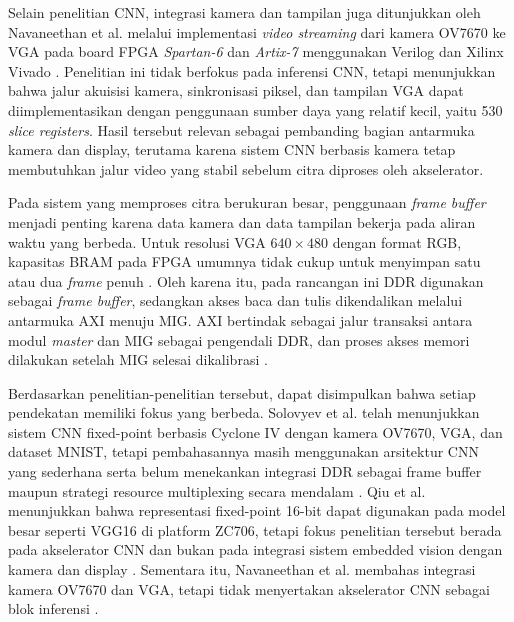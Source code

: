     Selain penelitian CNN, integrasi kamera dan tampilan juga ditunjukkan
    oleh Navaneethan et al. melalui implementasi \emph{video streaming}
    dari kamera OV7670 ke VGA pada board FPGA \emph{Spartan-6} dan
    \emph{Artix-7} menggunakan Verilog dan Xilinx Vivado
    \cite{Navaneethan2022OV7670VGA}. Penelitian ini tidak berfokus pada
    inferensi CNN, tetapi menunjukkan bahwa jalur akuisisi kamera,
    sinkronisasi piksel, dan tampilan VGA dapat diimplementasikan dengan
    penggunaan sumber daya yang relatif kecil, yaitu 530
    \emph{slice registers}. Hasil tersebut relevan sebagai pembanding
    bagian antarmuka kamera dan display, terutama karena sistem CNN
    berbasis kamera tetap membutuhkan jalur video yang stabil sebelum
    citra diproses oleh akselerator.

    Pada sistem yang memproses citra berukuran besar, penggunaan
    \emph{frame buffer} menjadi penting karena data kamera dan data
    tampilan bekerja pada aliran waktu yang berbeda. Untuk resolusi
    VGA $640 \times 480$ dengan format RGB, kapasitas BRAM pada FPGA
    umumnya tidak cukup untuk menyimpan satu atau dua \emph{frame}
    penuh \cite{Sun2021MicroBlazeVideoProcessing}. Oleh karena itu, pada
    rancangan ini DDR digunakan sebagai \emph{frame buffer}, sedangkan
    akses baca dan tulis dikendalikan melalui antarmuka AXI menuju MIG.
    AXI bertindak sebagai jalur transaksi antara modul \emph{master} dan
    MIG sebagai pengendali DDR, dan proses akses memori dilakukan setelah
    MIG selesai dikalibrasi \cite{Cosoroaba2013DDR3DataRates,Jacobo2021OV7670VGARepository}.

    Berdasarkan penelitian-penelitian tersebut, dapat disimpulkan bahwa setiap
    pendekatan memiliki fokus yang berbeda. Solovyev et al. telah menunjukkan
    sistem CNN fixed-point berbasis Cyclone IV dengan kamera OV7670, VGA, dan
    dataset MNIST, tetapi pembahasannya masih menggunakan arsitektur CNN yang
    sederhana serta belum menekankan integrasi DDR sebagai frame buffer maupun
    strategi resource multiplexing secara mendalam \cite{Solovyev2019FixedPointCNN}.
    Qiu et al. menunjukkan bahwa representasi fixed-point 16-bit dapat digunakan
    pada model besar seperti VGG16 di platform ZC706, tetapi fokus penelitian
    tersebut berada pada akselerator CNN dan bukan pada integrasi sistem embedded
    vision dengan kamera dan display \cite{Qiu2016GoingDeeperFPGA}. Sementara itu,
    Navaneethan et al. membahas integrasi kamera OV7670 dan VGA, tetapi tidak
    menyertakan akselerator CNN sebagai blok inferensi \cite{Navaneethan2022OV7670VGA}.

